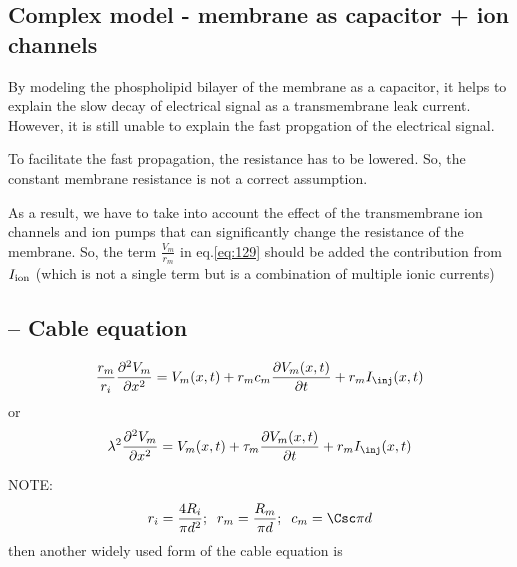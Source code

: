 \subsection{Complex model - membrane as capacitor + ion channels}
\label{sec:complex-model-action}

By modeling the phospholipid bilayer of the membrane as a capacitor, it helps to
explain the slow decay of electrical signal as a transmembrane leak current.
However, it is still unable to explain the fast propgation of the electrical
signal.

To facilitate the fast propagation, the resistance has to be lowered.
So, the constant membrane resistance is not a correct assumption.

As a result, we have to take into account the effect of the transmembrane ion
channels and ion pumps that can significantly change the
resistance of the membrane. So, the term $\frac{V_m}{r_m}$ in eq.\ref{eq:129}
should be added the contribution from $I_{\text{ion}}$ (which is not a single term but
is a combination of multiple ionic currents)





\subsection{ -- Cable equation}
\label{sec:cable_equation}

\begin{equation}
  \frac{r_m}{r_i} \frac{\partial ^2V_m}{\partial x^2} = V_m(x,t) +
  r_m c_m \frac{\partial V_m (x,t)}{\partial t} + r_m I_\inj(x,t)
\end{equation}
or
\begin{equation}
  \lambda^2 \frac{\partial ^2V_m}{\partial x^2} = V_m(x,t) +
  \tau_m \frac{\partial V_m (x,t)}{\partial t} + r_m I_\inj(x,t)
\end{equation}

NOTE:
\begin{equation}
r_i = \frac{4R_i}{\pi d^2}; \;\; r_m = \frac{R_m}{\pi d}; \;\;
c_m = \Csc \pi d
\end{equation}
then another widely used form of the cable equation is


